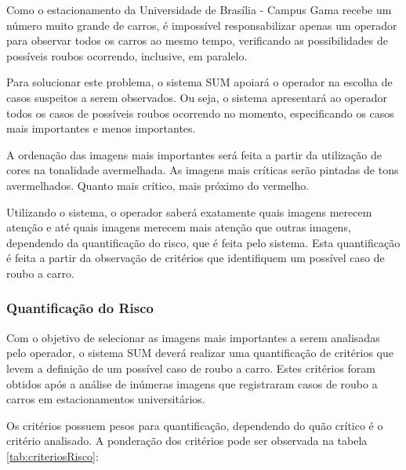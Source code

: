 	Como o estacionamento da Universidade de Brasília - Campus Gama recebe um número muito grande de carros, é impossível responsabilizar apenas um operador para observar todos os carros ao mesmo tempo, verificando as possibilidades de possíveis roubos ocorrendo, inclusive, em paralelo.

	Para solucionar este problema, o sistema SUM apoiará o operador na escolha de casos suspeitos a serem observados. Ou seja, o sistema apresentará ao operador todos os casos de possíveis roubos ocorrendo no momento, especificando os casos mais importantes e menos importantes.

	A ordenação das imagens mais importantes será feita a partir da utilização de cores na tonalidade avermelhada. As imagens mais críticas serão pintadas de tons avermelhados. Quanto mais crítico, mais próximo do vermelho.

	Utilizando o sistema, o operador saberá exatamente quais imagens merecem atenção e até quais imagens merecem mais atenção que outras imagens, dependendo da quantificação do risco, que é feita pelo sistema. Esta quantificação é feita a partir da observação de critérios que identifiquem um possível caso de roubo a carro.

\subsubsection{Quantificação do Risco}

	Com o objetivo de selecionar as imagens mais importantes a serem analisadas pelo operador, o sistema SUM deverá realizar uma quantificação de critérios que levem a definição de um possível caso de roubo a carro. Estes critérios foram obtidos após a análise de inúmeras imagens que registraram casos de roubo a carros em estacionamentos universitários.

	Os critérios possuem pesos para quantificação, dependendo do quão crítico é o critério analisado. A ponderação dos critérios pode ser observada na tabela \ref{tab:criteriosRisco}:

